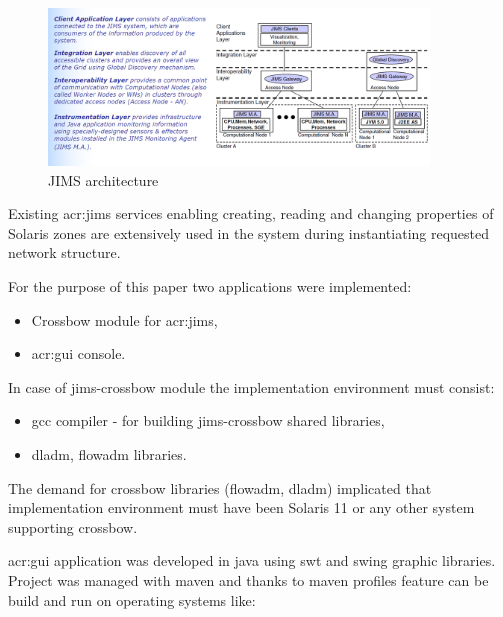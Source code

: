 \documentclass[11pt,openany]{book}
\begin{document}
      \begin{figure}[H]
        \begin{center}
          \includegraphics[width=0.9\textwidth]{img/jims/jims.png}
        \end{center}
        \caption{JIMS architecture \cite{jims}}
      \end{figure}
	 
      Existing \gls{acr:jims} services enabling creating, reading and changing properties of Solaris zones are
      extensively used in the system during instantiating requested network structure.
    
      \medskip
	
      For the purpose of this paper two applications were implemented:
	
      \begin{itemize}
        \item Crossbow module for \gls{acr:jims},
        \item \gls{acr:gui} console.
      \end{itemize}
	  
	  \medskip
	

      In case of jims-crossbow module the implementation environment must consist:

      \begin{itemize}
        \item gcc compiler - for building jims-crossbow shared libraries,
        \item dladm, flowadm libraries.
      \end{itemize}
	
      The demand for crossbow libraries (flowadm, dladm) implicated that implementation environment must have been
      Solaris 11 or any other system supporting crossbow.
    
      \gls{acr:gui} application was developed in java using swt and swing graphic libraries. Project was managed with
      maven and thanks to maven profiles feature can be build and run on operating systems like:
\end{document}
